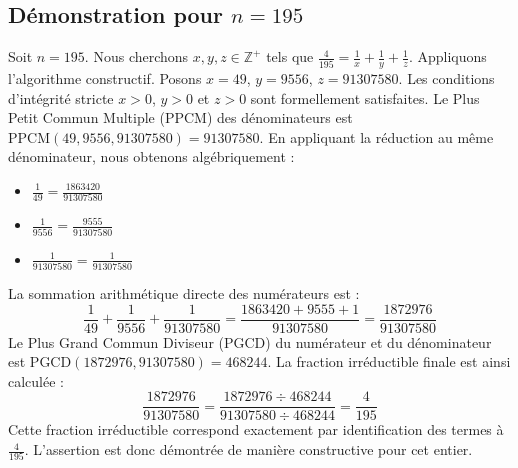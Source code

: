 \documentclass[11pt,a4paper]{article}
\begin{document}
\subsection{Démonstration pour $n = 195$}
Soit $n = 195$. Nous cherchons $x, y, z \in \mathbb{Z}^{+}$ tels que $\frac{4}{195} = \frac{1}{x} + \frac{1}{y} + \frac{1}{z}$.
Appliquons l'algorithme constructif. Posons $x = 49$, $y = 9556$, $z = 91307580$.
Les conditions d'intégrité stricte $x > 0$, $y > 0$ et $z > 0$ sont formellement satisfaites.
Le Plus Petit Commun Multiple (PPCM) des dénominateurs est $\text{PPCM}(49, 9556, 91307580) = 91307580$.
En appliquant la réduction au même dénominateur, nous obtenons algébriquement :
\begin{itemize}
    \item $\frac{1}{49} = \frac{1863420}{91307580}$
    \item $\frac{1}{9556} = \frac{9555}{91307580}$
    \item $\frac{1}{91307580} = \frac{1}{91307580}$
\end{itemize}
La sommation arithmétique directe des numérateurs est :
$$ \frac{1}{49} + \frac{1}{9556} + \frac{1}{91307580} = \frac{1863420 + 9555 + 1}{91307580} = \frac{1872976}{91307580} $$
Le Plus Grand Commun Diviseur (PGCD) du numérateur et du dénominateur est $\text{PGCD}(1872976, 91307580) = 468244$.
La fraction irréductible finale est ainsi calculée :
$$ \frac{1872976}{91307580} = \frac{1872976 \div 468244}{91307580 \div 468244} = \frac{4}{195} $$
Cette fraction irréductible correspond exactement par identification des termes à $\frac{4}{195}$. L'assertion est donc démontrée de manière constructive pour cet entier.
\end{document}
